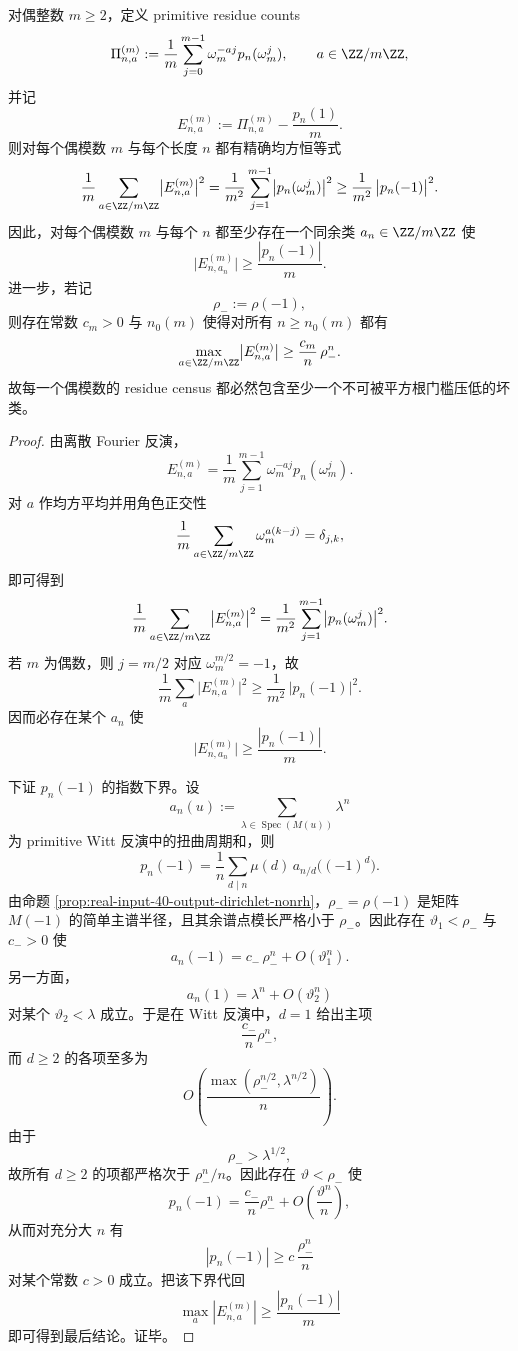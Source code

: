 \begin{theorem}\label{thm:conclusion-dirichlet-even-modulus-bad-residue-census}
对偶整数 \(m\ge 2\)，定义 primitive residue counts
\[
\Pi_{n,a}^{(m)}
:=
\frac1m\sum_{j=0}^{m-1}\omega_m^{-aj}p_n(\omega_m^j),
\qquad
a\in \ZZ/m\ZZ,
\]
并记
\[
E_{n,a}^{(m)}:=\Pi_{n,a}^{(m)}-\frac{p_n(1)}{m}.
\]
则对每个偶模数 \(m\) 与每个长度 \(n\) 都有精确均方恒等式
\[
\frac1m\sum_{a\in \ZZ/m\ZZ}\bigl|E_{n,a}^{(m)}\bigr|^2
=
\frac1{m^2}\sum_{j=1}^{m-1}\bigl|p_n(\omega_m^j)\bigr|^2
\ge
\frac1{m^2}\,\bigl|p_n(-1)\bigr|^2.
\]
因此，对每个偶模数 \(m\) 与每个 \(n\) 都至少存在一个同余类 \(a_n\in \ZZ/m\ZZ\) 使
\[
\bigl|E_{n,a_n}^{(m)}\bigr|\ge \frac{|p_n(-1)|}{m}.
\]
进一步，若记
\[
\rho_-:=\rho(-1),
\]
则存在常数 \(c_m>0\) 与 \(n_0(m)\) 使得对所有 \(n\ge n_0(m)\) 都有
\[
\max_{a\in \ZZ/m\ZZ}\bigl|E_{n,a}^{(m)}\bigr|
\ge
\frac{c_m}{n}\,\rho_-^n.
\]
故每一个偶模数的 residue census 都必然包含至少一个不可被平方根门槛压低的坏类。
\end{theorem}
\begin{proof}
由离散 Fourier 反演，
\[
E_{n,a}^{(m)}
=
\frac1m\sum_{j=1}^{m-1}\omega_m^{-aj}p_n(\omega_m^j).
\]
对 \(a\) 作均方平均并用角色正交性
\[
\frac1m\sum_{a\in \ZZ/m\ZZ}\omega_m^{a(k-j)}=\delta_{j,k},
\]
即可得到
\[
\frac1m\sum_{a\in \ZZ/m\ZZ}\bigl|E_{n,a}^{(m)}\bigr|^2
=
\frac1{m^2}\sum_{j=1}^{m-1}\bigl|p_n(\omega_m^j)\bigr|^2.
\]
若 \(m\) 为偶数，则 \(j=m/2\) 对应 \(\omega_m^{m/2}=-1\)，故
\[
\frac1m\sum_{a}\bigl|E_{n,a}^{(m)}\bigr|^2
\ge
\frac1{m^2}\,\bigl|p_n(-1)\bigr|^2.
\]
因而必存在某个 \(a_n\) 使
\[
\bigl|E_{n,a_n}^{(m)}\bigr|\ge \frac{|p_n(-1)|}{m}.
\]

下证 \(p_n(-1)\) 的指数下界。设
\[
a_n(u):=\sum_{\lambda\in \operatorname{Spec}(M(u))}\lambda^n
\]
为 primitive Witt 反演中的扭曲周期和，则
\[
p_n(-1)=\frac1n\sum_{d\mid n}\mu(d)\,a_{n/d}\!\bigl((-1)^d\bigr).
\]
由命题 \ref{prop:real-input-40-output-dirichlet-nonrh}，\(\rho_-=\rho(-1)\) 是矩阵 \(M(-1)\) 的简单主谱半径，且其余谱点模长严格小于 \(\rho_-\)。因此存在 \(\vartheta_1<\rho_-\) 与 \(c_->0\) 使
\[
a_n(-1)=c_-\,\rho_-^n+O(\vartheta_1^n).
\]
另一方面，
\[
a_n(1)=\lambda^n+O(\vartheta_2^n)
\]
对某个 \(\vartheta_2<\lambda\) 成立。于是在 Witt 反演中，\(d=1\) 给出主项
\[
\frac{c_-}{n}\rho_-^n,
\]
而 \(d\ge 2\) 的各项至多为
\[
O\!\left(\frac{\max(\rho_-^{n/2},\lambda^{n/2})}{n}\right).
\]
由于
\[
\rho_->\lambda^{1/2},
\]
故所有 \(d\ge 2\) 的项都严格次于 \(\rho_-^n/n\)。因此存在 \(\vartheta<\rho_-\) 使
\[
p_n(-1)=\frac{c_-}{n}\rho_-^n+O\!\left(\frac{\vartheta^n}{n}\right),
\]
从而对充分大 \(n\) 有
\[
|p_n(-1)|\ge c\,\frac{\rho_-^n}{n}
\]
对某个常数 \(c>0\) 成立。把该下界代回
\[
\max_a |E_{n,a}^{(m)}|\ge \frac{|p_n(-1)|}{m}
\]
即可得到最后结论。证毕。
\end{proof}


